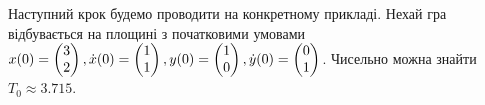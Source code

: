 \begin{example}
    Наступний крок будемо проводити на конкретному прикладі. Нехай гра відбувається на площині
    з початковими умовами $x(0) = \begin{pmatrix}
        3 \\ 2
    \end{pmatrix}, \dot{x}(0) = \begin{pmatrix}
        1 \\ 1
    \end{pmatrix}, y(0) = \begin{pmatrix}
        1 \\ 0
    \end{pmatrix}, \dot{y}(0) = \begin{pmatrix}
        0 \\ 1
    \end{pmatrix}$. Чисельно можна знайти $T_0 \approx 3.715$.
\end{example}
